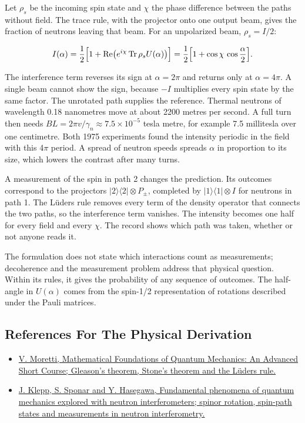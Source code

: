 \documentclass[11pt,oneside]{book}
\newenvironment{centeredalign}{\[\begin{gathered}[c]}{\end{gathered}\]}
\begin{document}
Let \(\rho_s\) be the incoming spin state and \(\chi\) the phase difference between the paths without field. The trace rule, with the projector onto one output beam, gives the fraction of neutrons leaving that beam. For an unpolarized beam, \(\rho_s=I/2\):

\begin{centeredalign}
I(\alpha)=\frac12\Bigl[1+\operatorname{Re}\bigl(e^{i\chi}\operatorname{Tr}\rho_sU(\alpha)\bigr)\Bigr]
=\frac12\Bigl[1+\cos\chi\,\cos\frac{\alpha}{2}\Bigr].
\end{centeredalign}

The interference term reverses its sign at \(\alpha=2\pi\) and returns only at \(\alpha=4\pi\). A single beam cannot show the sign, because \(-I\) multiplies every spin state by the same factor. The unrotated path supplies the reference. Thermal neutrons of wavelength 0.18 nanometres move at about 2200 metres per second. A full turn then needs \(BL=2\pi v/\gamma_n\approx7.5\times10^{-5}\) tesla metre, for example 7.5 millitesla over one centimetre. Both 1975 experiments found the intensity periodic in the field with this 4\(\pi\) period. A spread of neutron speeds spreads \(\alpha\) in proportion to its size, which lowers the contrast after many turns.

A measurement of the spin in path 2 changes the prediction. Its outcomes correspond to the projectors \(|2\rangle\langle2|\otimes P_\pm\), completed by \(|1\rangle\langle1|\otimes I\) for neutrons in path 1. The Lüders rule removes every term of the density operator that connects the two paths, so the interference term vanishes. The intensity becomes one half for every field and every \(\chi\). The record shows which path was taken, whether or not anyone reads it.

The formulation does not state which interactions count as measurements; decoherence and the measurement problem address that physical question. Within its rules, it gives the probability of any sequence of outcomes. The half-angle in \(U(\alpha)\) comes from the spin-1/2 representation of rotations described under the Pauli matrices.

\subsection*{References For The Physical Derivation}
\begin{itemize}
\item \href{https://arxiv.org/abs/1508.06951}{V. Moretti, Mathematical Foundations of Quantum Mechanics: An Advanced Short Course; Gleason's theorem, Stone's theorem and the Lüders rule.}
\item \href{https://arxiv.org/abs/1407.2526}{J. Klepp, S. Sponar and Y. Hasegawa, Fundamental phenomena of quantum mechanics explored with neutron interferometers; spinor rotation, spin-path states and measurements in neutron interferometry.}
\end{itemize}
\end{document}
